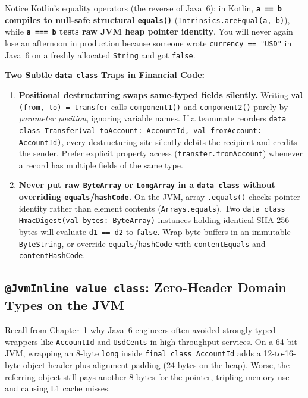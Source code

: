 Notice Kotlin's equality operators (the reverse of Java~6): in Kotlin, \textbf{\texttt{a == b} compiles to null-safe structural \texttt{equals()}} (\texttt{Intrinsics.areEqual(a, b)}), while \textbf{\texttt{a === b} tests raw JVM heap pointer identity}. You will never again lose an afternoon in production because someone wrote \texttt{currency == "USD"} in Java~6 on a freshly allocated \texttt{String} and got \texttt{false}.

\begin{trapbox}
\textbf{Two Subtle \texttt{data class} Traps in Financial Code:}
\begin{enumerate}
  \item \textbf{Positional destructuring swaps same-typed fields silently.} Writing \texttt{val (from, to) = transfer} calls \texttt{component1()} and \texttt{component2()} purely by \emph{parameter position}, ignoring variable names. If a teammate reorders \texttt{data class Transfer(val toAccount: AccountId, val fromAccount: AccountId)}, every destructuring site silently debits the recipient and credits the sender. Prefer explicit property access (\texttt{transfer.fromAccount}) whenever a record has multiple fields of the same type.
  \item \textbf{Never put raw \texttt{ByteArray} or \texttt{LongArray} in a \texttt{data class} without overriding \texttt{equals}/\texttt{hashCode}.} On the JVM, array \texttt{.equals()} checks pointer identity rather than element contents (\texttt{Arrays.equals}). Two \texttt{data class HmacDigest(val bytes: ByteArray)} instances holding identical SHA-256 bytes will evaluate \texttt{d1 == d2} to \texttt{false}. Wrap byte buffers in an immutable \texttt{ByteString}, or override \texttt{equals}/\texttt{hashCode} with \texttt{contentEquals} and \texttt{contentHashCode}.
\end{enumerate}
\end{trapbox}

\subsection{\texttt{@JvmInline value class}: Zero-Header Domain Types on the JVM}

Recall from Chapter~1 why Java~6 engineers often avoided strongly typed wrappers like \texttt{AccountId} and \texttt{UsdCents} in high-throughput services. On a 64-bit JVM, wrapping an 8-byte \texttt{long} inside \texttt{final class AccountId} adds a 12-to-16-byte object header plus alignment padding (24 bytes on the heap). Worse, the referring object still pays another 8 bytes for the pointer, tripling memory use and causing L1 cache misses.

